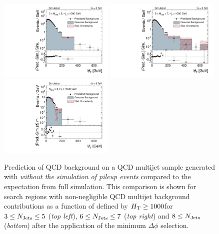 \begin{figure}[!t]
  \begin{minipage}[c]{1.\textwidth}
    \begin{center}
      \includegraphics[width=0.49\textwidth]{figures/MHT_JetBin2_HThigh_pythia_chsJets_pt0_NoPU_v1.pdf}%
      \includegraphics[width=0.49\textwidth]{figures/MHT_JetBin3_HThigh_pythia_chsJets_pt0_NoPU_v1.pdf}\\ 
      \includegraphics[width=0.49\textwidth]{figures/MHT_JetBin4_HThigh_pythia_chsJets_pt0_NoPU_v1.pdf}
    \end{center}
  \end{minipage}
  \caption{Prediction of QCD background on a QCD multijet sample generated with \pythia \textit{without the simulation of pileup events} compared to the expectation from full simulation. This comparison is shown for search regions with non-negligible QCD multijet background contributions as a function of \MHT defined by $H_{\text{T}} \ge 1000$\gev for $3 \le N_{\text{Jets}} \le 5$ (\textit{top left}), $6 \le N_{\text{Jets}} \le 7$ (\textit{top right}) and $8 \le N_{\text{Jets}}$ (\textit{bottom}) after the application of the minimum $\Delta \phi$ selection.}
  \label{fig:qcd_rs_closure_nopu}
\end{figure}
